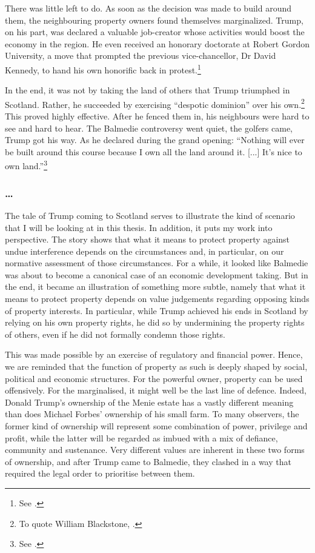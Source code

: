 There was little left to do. As soon as the decision was made to build around them, the neighbouring property owners found themselves marginalized. Trump, on his part, was declared a valuable job-creator whose activities would boost the economy in the region. He even received an honorary doctorate at Robert Gordon University, a move that prompted the previous vice-chancellor, Dr David Kennedy, to hand his own honorific back in protest.\footnote{See \cite{bbc10b}.}

In the end, it was not by taking the land of others that Trump triumphed in Scotland. Rather, he succeeded by exercising ``despotic dominion'' over his own.\footnote{To quote William Blackstone, \cite[2]{blackstone79b}.} This proved highly effective. After he fenced them in, his neighbours were hard to see and hard to hear. The Balmedie controversy went quiet, the golfers came, Trump got his way. As he declared during the grand opening: ``Nothing will ever be built around this course because I own all the land around it. [...] It's nice to own land.''\footnote{See \cite{booth12}.}

\subsubsection*{\ldots}

The tale of Trump coming to Scotland serves to illustrate the kind of scenario that I will be looking at in this thesis. In addition, it puts my work into perspective. The story shows that what it means to protect property against undue interference depends on the circumstances and, in particular, on our normative assessment of those circumstances. For a while, it looked like Balmedie was about to become a canonical case of an economic development taking. But in the end, it became an illustration of something more subtle, namely that what it means to protect property depends on value judgements regarding opposing kinds of property interests. In particular, while Trump achieved his ends in Scotland by relying on his own property rights, he did so by undermining the property rights of others, even if he did not formally condemn those rights.

This was made possible by an exercise of regulatory and financial power. Hence, we are reminded that the function of property as such is deeply shaped by social, political and economic structures. For the powerful owner, property can be used offensively. For the marginalised, it might well be the last line of defence. Indeed, Donald Trump's ownership of the Menie estate has a vastly different meaning than does Michael Forbes' ownership of his small farm. To many observers, the former kind of ownership will represent some combination of power, privilege and profit, while the latter will be regarded as imbued with a mix of defiance, community and sustenance. Very different values are inherent in these two forms of ownership, and after Trump came to Balmedie, they clashed in a way that required the legal order to prioritise between them.

